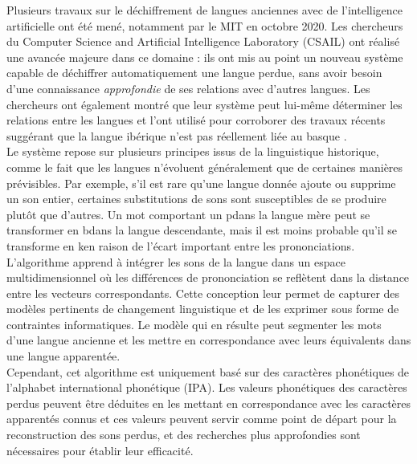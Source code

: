 \documentclass[12pt, french, twoside]{report}
\begin{document}
Plusieurs travaux sur le déchiffrement de langues anciennes avec de l'intelligence artificielle ont été mené, notamment par le MIT en octobre 2020. Les chercheurs du Computer Science and Artificial Intelligence Laboratory (CSAIL) ont réalisé une avancée majeure dans ce domaine \cite{luo-et-al-2020} : ils ont mis au point un nouveau système capable de déchiffrer automatiquement une langue perdue, sans avoir besoin d'une connaissance \textit{approfondie} de ses relations avec d'autres langues. Les chercheurs ont également montré que leur système peut lui-même déterminer les relations entre les langues et l'ont utilisé pour corroborer des travaux récents suggérant que la langue ibérique n'est pas réellement liée au basque \cite{deepmind2022}.\\

Le système repose sur plusieurs principes issus de la linguistique historique, comme le fait que les langues n'évoluent généralement que de certaines manières prévisibles. Par exemple, s'il est rare qu'une langue donnée ajoute ou supprime un son entier, certaines substitutions de sons sont susceptibles de se produire plutôt que d'autres. Un mot comportant un \og p\fg dans la langue mère peut se transformer en \og b\fg dans la langue descendante, mais il est moins probable qu'il se transforme en \og k\fg en raison de l'écart important entre les prononciations. L'algorithme apprend à intégrer les sons de la langue dans un espace multidimensionnel où les différences de prononciation se reflètent dans la distance entre les vecteurs correspondants. Cette conception leur permet de capturer des modèles pertinents de changement linguistique et de les exprimer sous forme de contraintes informatiques. Le modèle qui en résulte peut segmenter les mots d'une langue ancienne et les mettre en correspondance avec leurs équivalents dans une langue apparentée.\\ 

Cependant, cet algorithme est uniquement basé sur des caractères phonétiques de l'alphabet international phonétique (IPA). Les valeurs phonétiques des caractères perdus peuvent être déduites en les mettant en correspondance avec les caractères apparentés connus et ces valeurs peuvent servir comme point de départ pour la reconstruction des sons perdus, et des recherches plus approfondies sont nécessaires pour établir leur efficacité.\\
\end{document}
